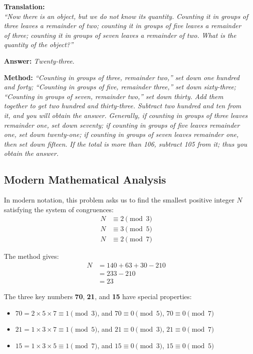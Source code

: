 \documentclass[11pt,a4paper]{article}
\begin{document}
\vspace{0.5cm}

\textbf{Translation:}\\[0.2cm]
\textit{``Now there is an object, but we do not know its quantity. Counting it in groups of three leaves a remainder of two; counting it in groups of five leaves a remainder of three; counting it in groups of seven leaves a remainder of two. What is the quantity of the object?''}

\vspace{0.3cm}
\textbf{Answer:} \textit{Twenty-three.}

\vspace{0.3cm}
\textbf{Method:} \textit{``Counting in groups of three, remainder two,'' set down one hundred and forty; ``Counting in groups of five, remainder three,'' set down sixty-three; ``Counting in groups of seven, remainder two,'' set down thirty. Add them together to get two hundred and thirty-three. Subtract two hundred and ten from it, and you will obtain the answer. Generally, if counting in groups of three leaves remainder one, set down seventy; if counting in groups of five leaves remainder one, set down twenty-one; if counting in groups of seven leaves remainder one, then set down fifteen. If the total is more than 106, subtract 105 from it; thus you obtain the answer.}

\subsection*{Modern Mathematical Analysis}

In modern notation, this problem asks us to find the smallest positive integer $N$ satisfying the system of congruences:
\begin{align*}
N &\equiv 2 \pmod{3} \\
N &\equiv 3 \pmod{5} \\
N &\equiv 2 \pmod{7}
\end{align*}

The method gives:
\begin{align*}
N &= 140 + 63 + 30 - 210 \\
  &= 233 - 210 \\
  &= 23
\end{align*}

The three key numbers \textbf{70}, \textbf{21}, and \textbf{15} have special properties:
\begin{itemize}[leftmargin=2em]
  \item $70 = 2 \times 5 \times 7 \equiv 1 \pmod{3}$, and $70 \equiv 0 \pmod{5}$, $70 \equiv 0 \pmod{7}$
  \item $21 = 1 \times 3 \times 7 \equiv 1 \pmod{5}$, and $21 \equiv 0 \pmod{3}$, $21 \equiv 0 \pmod{7}$
  \item $15 = 1 \times 3 \times 5 \equiv 1 \pmod{7}$, and $15 \equiv 0 \pmod{3}$, $15 \equiv 0 \pmod{5}$
\end{itemize}
\end{document}

